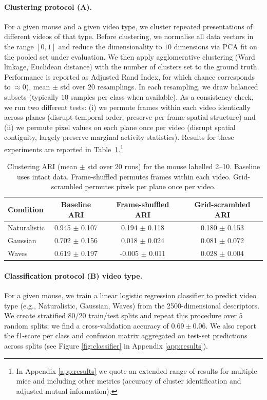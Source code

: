 \documentclass[11pt]{article}
\begin{document}
\paragraph{Clustering protocol (A).} For a given mouse and a given video type, we cluster repeated presentations of different videos of that type. Before clustering, we normalise all data vectors in the range $[0,1]$ and reduce the dimensionality to $10$ dimensions via PCA fit on the pooled set under evaluation. We then apply agglomerative clustering (Ward linkage, Euclidean distance) with the number of clusters set to the ground truth. Performance is reported as Adjusted Rand Index, for which chance corresponds to $\approx 0$), mean $\pm$ std over $20$ resamplings. In each resampling, we draw balanced subsets (typically $10$ samples per class when available). As a consistency check, we run two different tests: (i) we permute frames within each video identically across planes (disrupt temporal order, preserve per-frame spatial structure) and (ii) we permute pixel values on each plane once per video (disrupt spatial contiguity, largely preserve marginal activity statistics). Results for these experiments are reported in Table~\ref{tab:exp_ari_main}.\footnote{In Appendix \ref{app:results} we quote an extended range of results for multiple mice and including other metrics (accuracy of cluster identification and adjusted mutual information).}
\begin{table}[h]
\centering
\small
\begin{tabular}{lccc}
\toprule
Condition & Baseline ARI & Frame-shuffled ARI & Grid-scrambled ARI \\
\midrule
  Naturalistic & 0.945 $\pm$ 0.107 & 0.194 $\pm$ 0.118 & 0.180 $\pm$ 0.153 \\
  Gaussian & 0.702 $\pm$ 0.156 & 0.018 $\pm$ 0.024 & 0.081 $\pm$ 0.072 \\
  Waves & 0.619 $\pm$ 0.197 & -0.005 $\pm$ 0.011 & 0.028 $\pm$ 0.004 \\
\bottomrule
\end{tabular}
\caption{Clustering ARI (mean $\pm$ std over 20 runs) for the mouse labelled \textsf{2--10}. Baseline uses intact data. Frame-shuffled permutes frames within each video. Grid-scrambled permutes pixels per plane once per video.}
\label{tab:exp_ari_main}
\end{table}
\vspace{-2mm}
\paragraph{Classification protocol (B) video type.} For a given mouse, we train a linear logistic regression classifier to predict video type (e.g., Naturalistic, Gaussian, Waves) from the 2500-dimensional descriptors. We create stratified 80/20 train/test splits and repeat this procedure over $5$ random splits; we find a  cross-validation accuracy of $\mathbf{0.69 \pm 0.06}$. We also report the f1-score per class and confusion matrix aggregated on test-set predictions across splits (see Figure \ref{fig:classifier} in Appendix \ref{app:results}).
\end{document}
